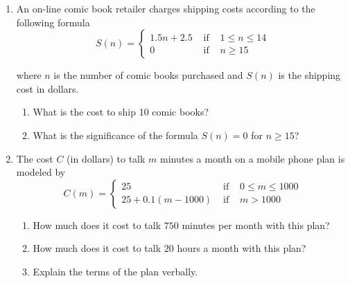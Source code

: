 \begin{enumerate}
\begin{enumerate}
\end{enumerate}

\item \label{piecewiseshipping} An on-line comic book retailer charges shipping costs according to the following formula \[{\displaystyle S(n) = \left\{ \begin{array}{rcl}  1.5 n + 2.5 & \mbox{ if } & 1 \leq n \leq 14  \\
                                                            0  & \mbox{ if } & n \geq 15
                                     \end{array} \right. }\]
                                     
where $n$ is the number of  comic books purchased and $S(n)$ is the shipping cost in dollars.
                                     
\begin{enumerate}

\item  What is the cost to ship 10 comic books?  %

\item  What is the significance of the formula $S(n) = 0$ for $n \geq 15$?   %
 
\end{enumerate}

\item  \label{piecewisemobile} The cost $C$ (in dollars) to talk $m$ minutes a month on a mobile phone plan is modeled by   \[{\displaystyle C(m) = \left\{ \begin{array}{rcl} 25 & \mbox{ if } & 0 \leq m \leq 1000 \\
                                                            25+0.1(m-1000) & \mbox{ if } & m > 1000
                                     \end{array} \right. }\]
                                     
\begin{enumerate}

\item  How much does it cost to talk $750$ minutes per month with this plan?  %

\item  How much does it cost to talk $20$ hours a month with this plan?  %

\item  Explain the terms of the plan verbally.  %
 

\end{enumerate}
\end{enumerate}
